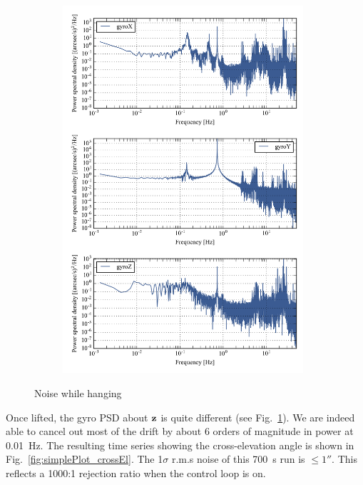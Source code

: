 \begin{landscape}
\begin{figure}[!h]
\begin{subfigure}[b]{0.7\textwidth}
	\includegraphics[width=0.98\textwidth]{Figures/multiPSD100.png}
	\caption{}
	\label{fig:multiPSD100_controlled}
	\end{subfigure}
\label{fig:multiPSD}
\caption[Noise while hanging]{Noise while hanging}
\end{figure}
\end{landscape}



Once lifted, the gyro PSD about $\textrm{\textbf{z}}$ is quite different (see Fig.~\ref{fig:multiPSD100_controlled}). We are indeed able to cancel out most of the drift by about 6 orders of magnitude in power at \SI{0.01}{\hertz}. The resulting time series showing the cross-elevation angle is shown in Fig.~\ref{fig:simplePlot_crossEl}. The 1$\sigma$ r.m.s noise of this \SI{700}{\second} run is $\le\ang{;;1}$. This reflects a 1000:1 rejection ratio when the control loop is on.

